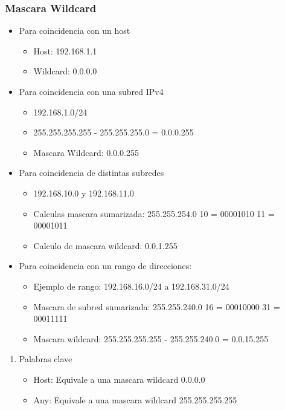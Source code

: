 \documentclass[11pt]{article}
\begin{document}
\subsubsection{Mascara Wildcard}
\label{sec:org23c1d05}
\begin{itemize}
\item Para coincidencia con un host
\begin{itemize}
\item Host: 192.168.1.1
\item Wildcard: 0.0.0.0
\end{itemize}

\item Para coincidencia con una subred IPv4
\begin{itemize}
\item 192.168.1.0/24
\item 255.255.255.255 - 255.255.255.0 = 0.0.0.255
\item Mascara Wildcard: 0.0.0.255
\end{itemize}

\item Para coincidencia de distintas subredes
\begin{itemize}
\item 192.168.10.0 y 192.168.11.0
\item Calculas mascara sumarizada: 255.255.254.0
10 = 00001010
11 = 00001011
\item Calculo de mascara wildcard: 0.0.1.255
\end{itemize}

\item Para coincidencia con un rango de direcciones:
\begin{itemize}
\item Ejemplo de rango: 192.168.16.0/24 a 192.168.31.0/24
\item Mascara de subred sumarizada: 255.255.240.0
16 = 00010000
31 = 00011111

\item Mascara wildcard: 255.255.255.255 - 255.255.240.0 = 0.0.15.255
\end{itemize}
\end{itemize}
\begin{enumerate}
\item Palabras clave
\label{sec:org73deaae}
\begin{itemize}
\item Host: Equivale a una mascara wildcard 0.0.0.0
\item Any: Equivale a una mascara wildcard 255.255.255.255
\end{itemize}
\end{enumerate}
\end{document}
